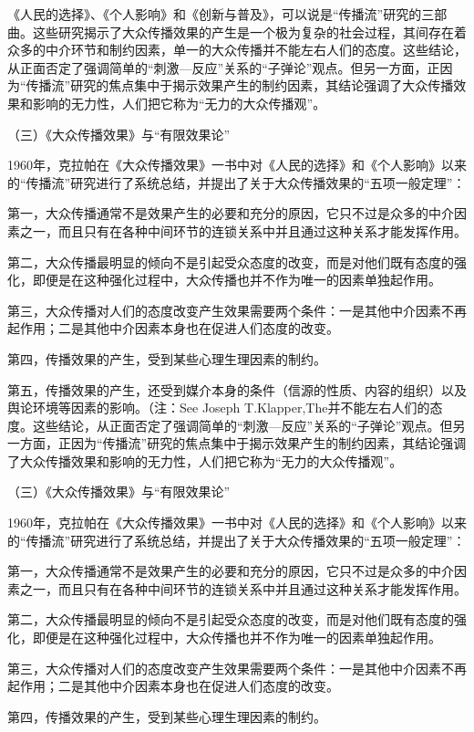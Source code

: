 \documentclass[UTF8,12pt]{ctexart}
\numberwithin{equation}{section} %
\numberwithin{figure}{section}
\numberwithin{table}{section}
\begin{document}
	《人民的选择》、《个人影响》和《创新与普及》，可以说是“传播流”研究的三部曲。这些研究揭示了大众传播效果的产生是一个极为复杂的社会过程，其间存在着众多的中介环节和制约因素，单一的大众传播并不能左右人们的态度。这些结论，从正面否定了强调简单的“刺激—反应”关系的“子弹论”观点。但另一方面，正因为“传播流”研究的焦点集中于揭示效果产生的制约因素，其结论强调了大众传播效果和影响的无力性，人们把它称为“无力的大众传播观”。
	
	（三）《大众传播效果》与“有限效果论”
	
	1960年，克拉帕在《大众传播效果》一书中对《人民的选择》和《个人影响》以来的“传播流”研究进行了系统总结，并提出了关于大众传播效果的“五项一般定理”：
	
	第一，大众传播通常不是效果产生的必要和充分的原因，它只不过是众多的中介因素之一，而且只有在各种中间环节的连锁关系中并且通过这种关系才能发挥作用。
	
	第二，大众传播最明显的倾向不是引起受众态度的改变，而是对他们既有态度的强化，即便是在这种强化过程中，大众传播也并不作为唯一的因素单独起作用。
	
	第三，大众传播对人们的态度改变产生效果需要两个条件：一是其他中介因素不再起作用；二是其他中介因素本身也在促进人们态度的改变。
	
	第四，传播效果的产生，受到某些心理生理因素的制约。
	
	第五，传播效果的产生，还受到媒介本身的条件（信源的性质、内容的组织）以及舆论环境等因素的影响。（注：See Joseph T.Klapper,The并不能左右人们的态度。这些结论，从正面否定了强调简单的“刺激—反应”关系的“子弹论”观点。但另一方面，正因为“传播流”研究的焦点集中于揭示效果产生的制约因素，其结论强调了大众传播效果和影响的无力性，人们把它称为“无力的大众传播观”。
	
	（三）《大众传播效果》与“有限效果论”
	
	1960年，克拉帕在《大众传播效果》一书中对《人民的选择》和《个人影响》以来的“传播流”研究进行了系统总结，并提出了关于大众传播效果的“五项一般定理”：
	
	第一，大众传播通常不是效果产生的必要和充分的原因，它只不过是众多的中介因素之一，而且只有在各种中间环节的连锁关系中并且通过这种关系才能发挥作用。
	
	第二，大众传播最明显的倾向不是引起受众态度的改变，而是对他们既有态度的强化，即便是在这种强化过程中，大众传播也并不作为唯一的因素单独起作用。
	
	第三，大众传播对人们的态度改变产生效果需要两个条件：一是其他中介因素不再起作用；二是其他中介因素本身也在促进人们态度的改变。
	
	第四，传播效果的产生，受到某些心理生理因素的制约。
	
\end{document}
